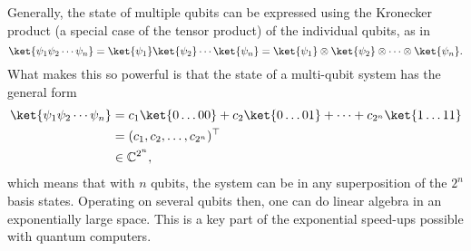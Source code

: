 Generally, the state of multiple qubits can be expressed using the Kronecker product (a special case of the tensor product) of the individual qubits, as in
\begin{equation}
  \ket{\psi_1 \psi_2 \cdots  \psi_n}
  = \ket{\psi_1} \ket{\psi_2} \cdots \ket{\psi_n}
  = \ket{\psi_1} \otimes \ket{\psi_2} \otimes \cdots \otimes \ket{\psi_n}
  \label{eq:tensor}.
\end{equation}
What makes this so powerful is that the state of a multi-qubit system has the general form
\begin{equation}
  \begin{aligned}
    \ket{\psi_1 \psi_2 \cdots  \psi_n}
     & = c_1 \ket{0\dots 00} + c_2 \ket{0\dots 01} + \cdots + c_{2^n} \ket{1\dots 11} \\
     & = (c_1, c_2, \dots, c_{2^n} )^\top                                             \\
     & \in \mathbb{C}^{2^n},
    \label{eq:superposition}
  \end{aligned}
\end{equation}
which means that with $n$ qubits, the system can be in any superposition of the $2^n$ basis states.
Operating on several qubits then, one can do linear algebra in an exponentially large space.
This is a key part of the exponential speed-ups possible with quantum computers.